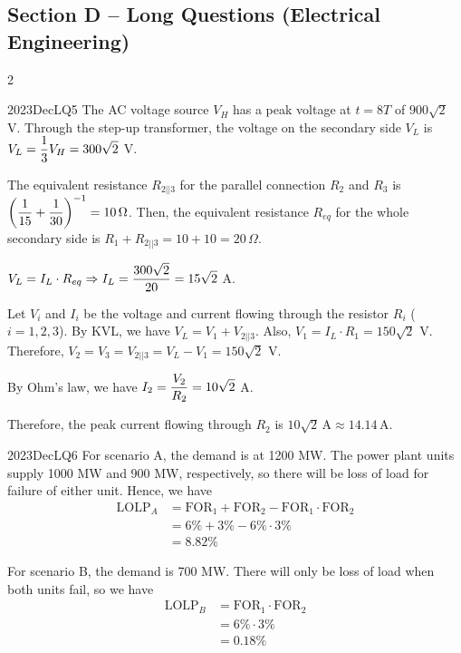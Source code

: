\subsection*{Section D -- Long Questions (Electrical Engineering)}
\begin{multicols}{2}

\begin{qsolution}{2023}{Dec}{LQ5}{\tgEE \tgEETransformer}
    The AC voltage source $V_H$ has a peak voltage at $t=8T$ of $900\sqrt 2$ V.
    Through the step-up transformer, the voltage on the secondary side $V_L$ is $\displaystyle V_L=\frac{1}{3}V_H=300\sqrt 2$ V.

    The equivalent resistance $R_{2||3}$ for the parallel connection $R_2$ and $R_3$ is $\displaystyle\left(\frac{1}{15}+\frac{1}{30}\right)^{-1}=10\,\Omega$.
    Then, the equivalent resistance $R_{eq}$ for the whole secondary side is $R_1+R_{2||3}=10+10=20\,\Omega$.

    $\displaystyle V_L=I_L\cdot R_{eq} \Rightarrow I_L=\frac{300\sqrt 2}{20}=15\sqrt 2$ A.

    Let $V_i$ and $I_i$ be the voltage and current flowing through the resistor $R_i$ ($i=1,2,3$).
    By KVL, we have $V_L=V_1+V_{2||3}$.
    Also, $V_1=I_L\cdot R_1=150\sqrt 2$ V.
    Therefore, $V_2=V_3=V_{2||3}=V_L-V_1=150\sqrt 2$ V.
    
    By Ohm's law, we have $\displaystyle I_2=\frac{V_2}{R_2}=10\sqrt 2$ A.

    Therefore, the peak current flowing through $R_2$ is $\boxed{10\sqrt 2\,\mathrm{A}} \approx 14.14\,\mathrm{A}$.
\end{qsolution}

\begin{qsolution}{2023}{Dec}{LQ6}{\tgEE \tgEEPowerSystems}
    For scenario A, the demand is at 1200 MW.
    The power plant units supply 1000 MW and 900 MW, respectively, so there will be loss of load for failure of either unit.
    Hence, we have
    \begin{align*}
        \mathrm{LOLP}_A &= \mathrm{FOR}_1 + \mathrm{FOR}_2 - \mathrm{FOR}_1 \cdot \mathrm{FOR}_2\\
        &= 6\% + 3\% - 6\% \cdot 3\%\\
        &= \boxed{8.82\%}
    \end{align*}

    For scenario B, the demand is 700 MW.
    There will only be loss of load when both units fail, so we have
    \begin{align*}
        \mathrm{LOLP}_B &= \mathrm{FOR}_1 \cdot \mathrm{FOR}_2\\
        &= 6\% \cdot 3\%\\
        &= \boxed{0.18\%}
    \end{align*}
\end{qsolution}

\end{multicols}